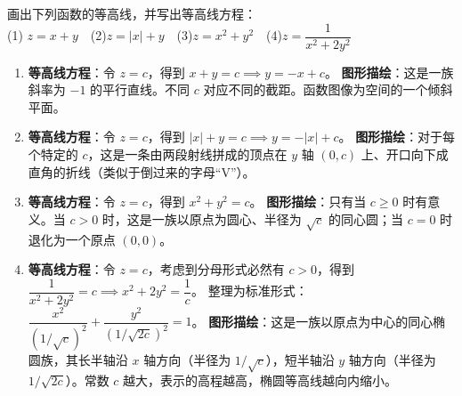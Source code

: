 \documentclass[lang=cn,11pt]{elegantbook}
\begin{document}
\begin{exercise}[绘制等高线]
画出下列函数的等高线，并写出等高线方程：\\
(1) $z = x+y$~~(2)$z = |x|+y$~~(3)$z = x^2+y^2$~~(4)$z = \dfrac{1}{x^2+2y^2}$
\end{exercise}
\begin{solution}
\begin{enumerate}
  \item[(1)] \textbf{等高线方程}：令 $z=c$，得到 $x+y=c \implies y = -x+c$。
  \textbf{图形描绘}：这是一族斜率为 $-1$ 的平行直线。不同 $c$ 对应不同的截距。函数图像为空间的一个倾斜平面。
  \item[(2)] \textbf{等高线方程}：令 $z=c$，得到 $|x|+y=c \implies y = -|x|+c$。
  \textbf{图形描绘}：对于每个特定的 $c$，这是一条由两段射线拼成的顶点在 $y$ 轴 $(0,c)$ 上、开口向下成直角的折线（类似于倒过来的字母“V”）。
  \item[(3)] \textbf{等高线方程}：令 $z=c$，得到 $x^2+y^2=c$。
  \textbf{图形描绘}：只有当 $c\geq 0$ 时有意义。当 $c>0$ 时，这是一族以原点为圆心、半径为 $\sqrt{c}$ 的同心圆；当 $c=0$ 时退化为一个原点 $(0,0)$。
  \item[(4)] \textbf{等高线方程}：令 $z=c$，考虑到分母形式必然有 $c>0$，得到 $\dfrac{1}{x^2+2y^2} = c \implies x^2+2y^2 = \dfrac{1}{c}$。
  整理为标准形式：$\dfrac{x^2}{(1/\sqrt{c})^2} + \dfrac{y^2}{(1/\sqrt{2c})^2} = 1$。
  \textbf{图形描绘}：这是一族以原点为中心的同心椭圆族，其长半轴沿 $x$ 轴方向（半径为 $1/\sqrt{c}$），短半轴沿 $y$ 轴方向（半径为 $1/\sqrt{2c}$）。常数 $c$ 越大，表示的高程越高，椭圆等高线越向内缩小。
\end{enumerate}
\end{solution}
\end{document}
